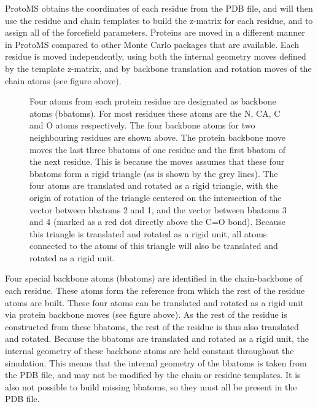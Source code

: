 \documentclass[letterpaper,10pt,english]{sphinxmanual}
\begin{document}
ProtoMS obtains the coordinates of each residue from the PDB file, and will then use the residue and chain templates to build the z-matrix for each residue, and to assign all of the forcefield parameters.
\label{protoms:bbatoms}
Proteins are moved in a different manner in ProtoMS compared to other Monte Carlo packages that are available. Each residue is moved independently, using both the internal geometry moves defined by the template z-matrix, and by backbone translation and rotation moves of the chain atoms (see figure above).
\begin{figure}[htbp]
\centering
\capstart

\caption{Four atoms from each protein residue are designated as backbone atoms (bbatoms). For most residues these atoms are the N, CA, C and O atoms respectively. The four backbone atoms for two neighbouring residues are shown above. The protein backbone move moves the last three bbatoms of one residue and the first bbatom of the next residue. This is because the moves assumes that these four bbatoms form a rigid triangle (as is shown by the grey lines). The four atoms are translated and rotated as a rigid triangle, with the origin of rotation of the triangle centered on the intersection of the vector between bbatoms 2 and 1, and the vector between bbatoms 3 and 4 (marked as a red dot directly above the C=O bond). Because this triangle is translated and rotated as a rigid unit, all atoms connected to the atoms of this triangle will also be translated and rotated as a rigid unit.}\end{figure}

Four special backbone atoms (bbatoms) are identified in the chain-backbone of each residue. These atoms form the reference from which the rest of the residue atoms are built. These four atoms can be translated and rotated as a rigid unit via protein backbone moves (see figure above). As the rest of the residue is constructed from these bbatoms, the rest of the residue is thus also translated and rotated. Because the bbatoms are translated and rotated as a rigid unit, the internal geometry of these backbone atoms are held constant throughout the simulation. This means that the internal geometry of the bbatoms is taken from the PDB file, and may not be modified by the chain or residue templates. It is also not possible to build missing bbatoms, so they must all be present in the PDB file.
\end{document}
